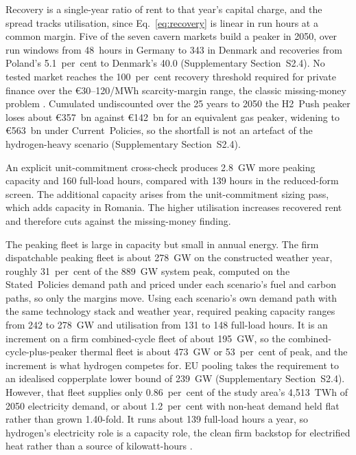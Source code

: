 Recovery is a single-year ratio of rent to that year's capital charge, and the spread
tracks utilisation, since Eq.~\eqref{eq:recovery} is linear in run hours at a common
margin. Five of the seven cavern markets build a peaker in 2050, over run windows from 48~hours in
Germany to 343 in Denmark and recoveries from Poland's 5.1~per~cent to Denmark's 40.0
(Supplementary Section~S2.4). No tested market reaches the 100~per~cent recovery threshold required for private finance over the \euro{}30--120/MWh scarcity-margin range, the
classic missing-money problem \citep{Joskow2008capacity,Newbery2016Missing}. Cumulated undiscounted over the 25 years to 2050 the H2~Push peaker loses about \euro{}357~bn against \euro{}142~bn
for an equivalent gas peaker, widening to \euro{}563~bn under Current~Policies, so the
shortfall is not an artefact of the hydrogen-heavy scenario (Supplementary
Section~S2.4).

An explicit unit-commitment cross-check produces 2.8~GW more peaking capacity and 160 full-load hours, compared with 139 hours in the reduced-form screen. The additional capacity arises from the unit-commitment sizing pass, which adds capacity in Romania. The higher utilisation increases recovered rent and therefore cuts against the missing-money finding.

The peaking fleet is large in capacity but small in annual energy. The firm dispatchable peaking fleet is
about 278~GW on the constructed weather year, roughly 31~per~cent of the 889~GW system
peak, computed on the Stated~Policies demand path and priced under each scenario's fuel and
carbon paths, so only the margins move. Using each scenario's own demand path with the same technology stack and weather year, required peaking capacity ranges from 242 to 278~GW and utilisation from
131 to 148 full-load hours. It is an increment on a firm combined-cycle
fleet of about 195~GW, so the combined-cycle-plus-peaker thermal fleet is about 473~GW or 53~per~cent of peak, and the increment is what hydrogen competes for. EU pooling takes the requirement to an idealised copperplate lower bound of 239~GW (Supplementary Section~S2.4). However, that fleet supplies only 0.86~per~cent of the study area's 4{,}513~TWh of 2050 electricity demand, or about 1.2~per~cent with non-heat demand held flat rather than grown 1.40-fold. It runs about 139 full-load hours a year, so hydrogen's electricity role is a capacity role, the clean firm backstop for electrified
heat rather than a source of kilowatt-hours
\citep{Sepulveda2018Firm,Bistline2020ValueOfTechnology}.

